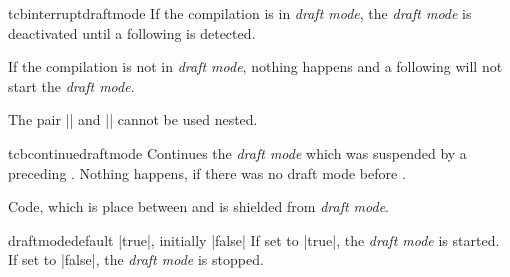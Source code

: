 \begin{docCommand}{tcbinterruptdraftmode}{}
  If the compilation is in \emph{draft mode}, the \emph{draft mode} is deactivated
  until a following  is detected.\par
  If the compilation is not in \emph{draft mode}, nothing happens and a following
   will not start the \emph{draft mode}.
  \begin{marker}
  The pair |\tcbinterruptdraftmode| and |\tcbcontinuedraftmode| cannot
  be used nested.
  \end{marker}
\end{docCommand}

\begin{docCommand}{tcbcontinuedraftmode}{}
  Continues the \emph{draft mode} which was suspended by a preceding
  . Nothing happens, if there was no draft
  mode before .
  \begin{marker}
  Code, which is place between  and
   is shielded from \emph{draft mode}.
  \end{marker}
\end{docCommand}


\clearpage

\begin{docTcbKey}{draftmode}{}{default |true|, initially |false|}
  If set to |true|, the \emph{draft mode} is started.
  If set to |false|, the \emph{draft mode} is stopped.

\end{docTcbKey}


